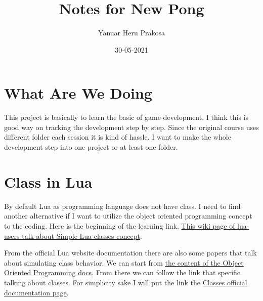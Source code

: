 \documentclass{article}
\title{Notes for New Pong}
\author{Yanuar Heru Prakosa}
\date{30-05-2021}
\begin{document}
    \maketitle

    \section{What Are We Doing}
    This project is basically to learn the basic of game development.
    I think this is good way on tracking the development step by step.
    Since the original course uses different folder each session it is kind of hassle.
    I want to make the whole development step into one project or at least one folder. 

    \section{Class in Lua}
    By default Lua as programming language does not have class. 
    I need to find another alternative if I want to utilize the object oriented programming concept to the coding. 
    Here is the beginning of the learning link. 
    \href{http://lua-users.org/wiki/SimpleLuaClasses}{This wiki page of lua-users talk about Simple Lua classes concept}.

    From the official Lua website documentation there are also some papers that talk about simulating class behavior.
    We can start from \href{https://www.lua.org/pil/contents.html#16}{the content of the Object Oriented Programming docs}.
    From there we can follow the link that specific talking about classes. 
    For simplicity sake I will put the link the \href{https://www.lua.org/pil/16.1.html}{Classes official documentation page}.
\end{document}
